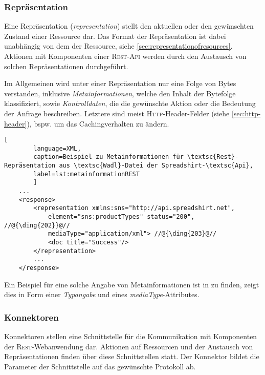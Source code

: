\subsubsection{Repräsentation}
\label{sec:representation}

Eine Repräsentation (\emph{representation}) stellt den aktuellen oder den gewünschten Zustand einer Ressource dar. Das Format der Repräsentation ist dabei unabhängig von dem der Ressource, siehe \cref{sec:representationofresources}.
Aktionen mit Komponenten einer \textsc{Rest}-\textsc{Api} werden durch den Austausch von solchen Repräsentationen durchgeführt.

Im Allgemeinen wird unter einer Repräsentation nur eine Folge von Bytes verstanden, inklusive \emph{Metainformationen}, welche den Inhalt der Bytefolge klassifiziert, sowie \emph{Kontrolldaten}, die die gewünschte Aktion oder die Bedeutung der Anfrage beschreiben. Letztere sind meist \textsc{Http}-Header-Felder (siehe \cref{sec:http-header}), bspw. um das Cachingverhalten zu ändern.

\begin{minipage}{\textwidth}
    \begin{lstlisting}[
        language=XML,
        caption=Beispiel zu Metainformationen für \textsc{Rest}-Repräsentation aus \textsc{Wadl}-Datei der Spreadshirt-\textsc{Api},
        label=lst:metainformationREST
        ]
    ...
    <response>
        <representation xmlns:sns="http://api.spreadshirt.net",
            element="sns:productTypes" status="200", //@{\ding{202}}@//
            mediaType="application/xml"> //@{\ding{203}@//
            <doc title="Success"/>
        </representation>
        ...
    </response>
    \end{lstlisting}
\end{minipage}

Ein Beispiel für eine solche Angabe von Metainformationen ist in  zu finden,  zeigt dies in Form einer \emph{Typangabe} und  eines \emph{mediaType}-Attributes.

\subsubsection{Konnektoren}

Konnektoren stellen eine Schnittstelle für die Kommunikation mit Komponenten der \textsc{Rest}-Webanwendung dar. Aktionen auf Ressourcen und der Austausch von Repräsentationen finden über diese Schnittstellen statt. Der Konnektor bildet die Parameter der Schnittstelle auf das gewünschte Protokoll ab.

